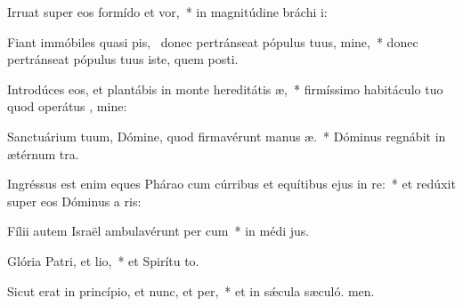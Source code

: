 \item Irruat super eos formído et vor,~* in magnitúdine bráchi i:
\item Fiant immóbiles quasi pis,~\pscross{} donec pertránseat pópulus tuus, mine,~* donec pertránseat pópulus tuus iste, quem posti.
\item Introdúces eos, et plantábis in monte hereditátis æ,~* firmíssimo habitáculo tuo quod operátus , mine:
\item Sanctuárium tuum, Dómine, quod firmavérunt manus æ.~* Dóminus regnábit in ætérnum  tra.
\item Ingréssus est enim eques Phárao cum cúrribus et equítibus ejus in re:~* et redúxit super eos Dóminus a ris:
\item Fílii autem Israël ambulavérunt per cum~* in médi jus.
\item Glória Patri, et lio,~* et Spirítu to.
\item Sicut erat in princípio, et nunc, et per,~* et in sǽcula sæculó. men.
